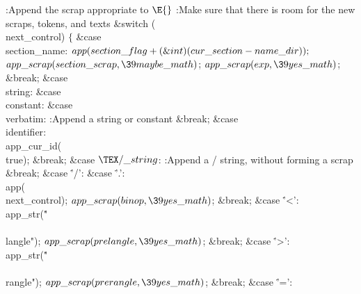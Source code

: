 \B{}:Append the scrap appropriate to \X${}\E{}$%
\6
:Make sure that there is room for the new scraps, tokens, and texts\X\6
\&{switch} (\\{next\_control})\5
${}\{{}$\1\6
\4\&{case} \\{section\_name}:\5
${}\\{app}(\\{section\_flag}+(\&{int})(\\{cur\_section}-\\{name\_dir}));{}$\6
${}\\{app\_scrap}(\\{section\_scrap},\39\\{maybe\_math}){}$;\5
${}\\{app\_scrap}(\\{exp},\39\\{yes\_math}){}$;\5
\&{break};\6
\4\&{case} \\{string}:\5
\&{case} \\{constant}:\5
\&{case} \\{verbatim}:\5
:Append a string or constant\X\5
\&{break};\6
\4\&{case} \\{identifier}:\5
\\{app\_cur\_id}(\\{true});\5
\&{break};\6
\4\&{case} ${}\TeXxstring{}$:\5
:Append a \TEX/ string, without forming a scrap\X\5
\&{break};\6
\4\&{case} \.{'/'}:\5
\&{case} \.{'.'}:\5
\\{app}(\\{next\_control});\5
${}\\{app\_scrap}(\\{binop},\39\\{yes\_math}){}$;\5
\&{break};\6
\4\&{case} \.{'<'}:\5
\\{app\_str}(\.{"\\\\langle"});\5
${}\\{app\_scrap}(\\{prelangle},\39\\{yes\_math}){}$;\5
\&{break};\6
\4\&{case} \.{'>'}:\5
\\{app\_str}(\.{"\\\\rangle"});\5
${}\\{app\_scrap}(\\{prerangle},\39\\{yes\_math}){}$;\5
\&{break};\6
\4\&{case} \.{'='}:\5
